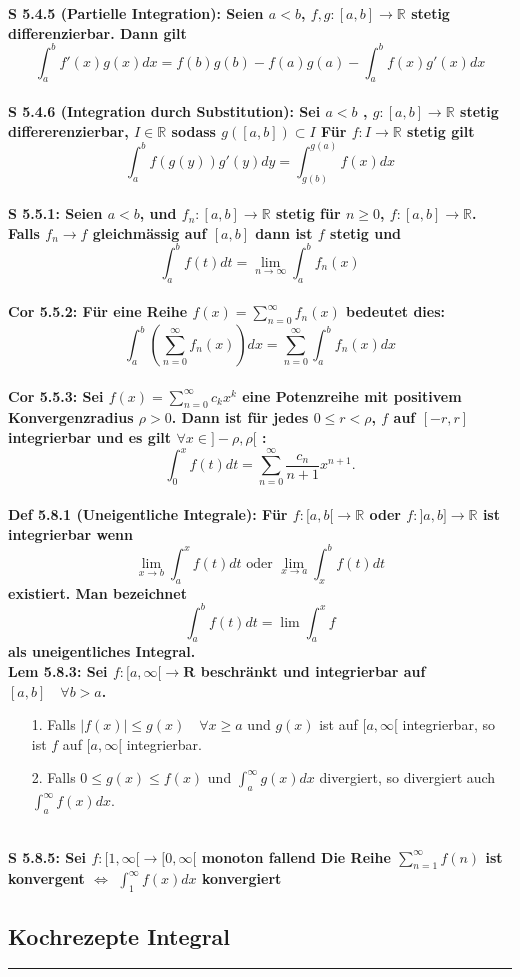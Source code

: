 \documentclass[7pt,landscape, margin = 0.1mm]{article}
\newcommand*{\mysubsection}[1]{\vspace{-2mm}\color{chaptercolor}\subsection{ #1 }
\vspace{-1mm}\hrule\vspace{1.5mm}\color{black}
\vspace{2mm}}
\newcommand{\DEF}[2]{\color{chaptercolor}\bf{Def #1}:\color{black}    \hspace{0.2cm} #2 \\}
\newcommand{\COR}[2]{\color{chaptercolor}\bf{Cor #1}:\color{black}    \hspace{0.2cm} #2 \\}
\newcommand{\LEM}[2]{\color{chaptercolor}\bf{Lem #1}:\color{black}    \hspace{0.2cm} #2 \\}
\newcommand{\SA}[2]{\color{chaptercolor}\bf{S #1}:\color{black}    \hspace{0.2cm} #2 \\}
\begin{document}
\begin{multicols}{4}
\begin{flushleft}
\SA{5.4.5 (Partielle Integration)}{Seien $a<b$, $f,g:[a,b] \longrightarrow \mathbb{R}$ stetig differenzierbar. Dann gilt
$$ \int_{a}^{b} f'(x)g(x)dx = f(b)g(b)-f(a)g(a)-\int_{a}^{b} f(x)g'(x)dx  
$$}
\SA{5.4.6 (Integration durch Substitution)}{Sei $a<b$ , $g:[a,b] \longrightarrow \mathbb{R}$ stetig differerenzierbar, $I \in \mathbb{R}$ sodass $g \left([a,b] \right) \subset I$
Für $f:I \longrightarrow \mathbb{R}$ stetig gilt
$$ \int_{a}^{b}f(g(y))g'(y)dy = \int_{g(b)}^{g(a)} f(x)dx  $$}
\SA{5.5.1}{ Seien $a<b$, und $f_n:[a,b] \longrightarrow \mathbb{R}$ stetig für $n \geq 0$, $f:[a,b] \longrightarrow \mathbb{R}$.
Falls $f_n \longrightarrow f$ gleichmässig auf $[a,b]$ dann ist $f$ stetig und
$$ \int_{a}^{b} f(t)dt = \lim_{n \to \infty} \int_{a}^{b} f_n(x)  $$}
\COR{5.5.2}{Für eine Reihe $f(x) = \sum_{n=0}^\infty f_n(x)$ bedeutet dies:
$$ \int_{a}^{b} \left(\sum_{n=0}^{\infty}f_n(x) \right) dx = \sum_{n=0}^{\infty} \int_{a}^{b} f_n(x) dx $$ }
\COR{5.5.3}{Sei
$
f(x)=\sum_{n=0}^{\infty} c_k x^k
$
eine Potenzreihe mit positivem Konvergenzradius $\rho>0$. Dann ist für jedes $0 \leqslant r<\rho$, $f$ auf $[-r, r]$ integrierbar und es gilt $\forall x \in]-\rho, \rho[$ :
$$
\int_0^x f(t) d t=\sum_{n=0}^{\infty} \frac{c_n}{n+1} x^{n+1} .
$$}
\DEF{5.8.1 (Uneigentliche Integrale)}{ Für $f:[a,b[ \longrightarrow \mathbb{R}$ oder $f:]a,b] \longrightarrow \mathbb{R}$ ist integrierbar wenn
$$ \lim_{x \to b} \int_{a}^{x} f(t)dt \text{ oder } \lim_{x \to a} \int_{x}^{b} f(t)dt $$
existiert.
Man bezeichnet
$$ \int_{a}^{b} f(t)dt = \lim \int_{a}^{x} f $$
als uneigentliches Integral.}
\LEM{5.8.3}{Sei $f:[a, \infty[\longrightarrow \mathbf{R}$ beschränkt und integrierbar auf $[a, b] \quad \forall b>a$.
\begin{itemize}
\item[1.] Falls $|f(x)| \leqslant g(x) \quad \forall x \geqslant a$ und $g(x)$ ist auf $[a, \infty[$ integrierbar, so ist $f$ auf $[a, \infty[$ integrierbar.
\item[2.]  Falls $0 \leqslant g(x) \leqslant f(x)$ und $\int_a^{\infty} g(x) d x$ divergiert, so divergiert auch $\int_a^{\infty} f(x) d x$.
\end{itemize}}
\SA{5.8.5}{Sei $f:[1,\infty[ \longrightarrow [0,\infty[$ monoton fallend
Die Reihe $\sum_{n=1}^{\infty} f(n)$ ist konvergent $\Leftrightarrow$ $\int_{1}^{\infty} f(x) dx$ konvergiert}

\mysubsection{Kochrezepte Integral}


\end{flushleft}
\end{multicols}
\end{document}
